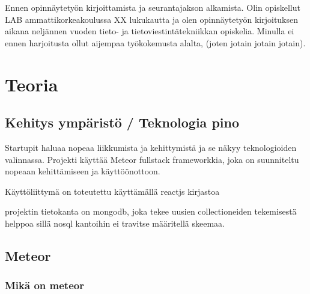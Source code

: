 \documentclass[11pt,a4paper,titlepage,oneside]{article}
\begin{document}
Ennen opinnäytetyön kirjoittamista ja seurantajakson alkamista. 
Olin opiskellut LAB ammattikorkeakoulussa XX lukukautta ja olen opinnäytetyön kirjoituksen aikana neljännen vuoden tieto- ja tietoviestintätekniikkan opiskelia.
%
Minulla ei ennen harjoitusta ollut aijempaa työkokemusta alalta, (joten jotain jotain jotain).
\medskip







\newpage
\section{Teoria}                %



\subsection{Kehitys ympäristö / Teknologia pino}


Startupit haluaa nopeaa liikkumista ja kehittymistä ja se näkyy teknologioiden valinnassa.
Projekti käyttää Meteor fullstack frameworkkia, joka on suunniteltu nopeaan kehittämiseen ja käyttöönottoon.
\medskip

Käyttöliittymä on toteutettu käyttämällä reactjs kirjastoa
\medskip

projektin tietokanta on mongodb, joka tekee uusien collectioneiden tekemisestä helppoa sillä nosql kantoihin ei travitse määritellä skeemaa.
\medskip










\newpage
\subsection{Meteor}                %



\subsubsection{Mikä on meteor}
\end{document}
